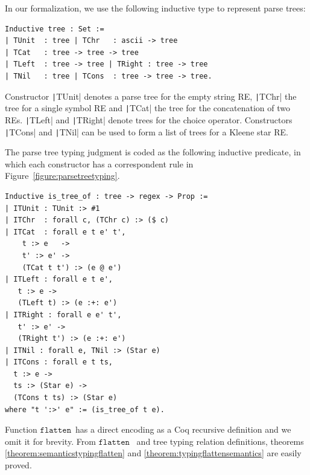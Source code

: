 \documentclass[oneside,12pt]{scrbook}
\theoremstyle{definition}
\newcommand{\flatten}{\ensuremath{\texttt{flatten}}}
\newcommand{\coq}[1]{\texttt|#1|}
\theoremstyle{plain}
\theoremstyle{definition}
\begin{document}
In our formalization, we use the following inductive type to represent parse
trees:

\begin{verbatim}
Inductive tree : Set :=
| TUnit  : tree | TChr   : ascii -> tree
| TCat   : tree -> tree -> tree 
| TLeft  : tree -> tree | TRight : tree -> tree 
| TNil   : tree | TCons  : tree -> tree -> tree.
\end{verbatim}

Constructor \coq{TUnit} denotes a parse tree for the empty string RE,
\coq{TChr} the tree for a single symbol RE and \coq{TCat} the tree for
the concatenation of two REs. \coq{TLeft} and \coq{TRight} denote trees
for the choice operator. Constructors \coq{TCons} and \coq{TNil} can be
used to form a list of trees for a Kleene star RE.

The parse tree typing judgment is
coded as the following inductive predicate, in which each constructor
has a correspondent rule in Figure~\ref{figure:parsetreetyping}.

\begin{verbatim}
Inductive is_tree_of : tree -> regex -> Prop :=
| ITUnit : TUnit :> #1
| ITChr  : forall c, (TChr c) :> ($ c)
| ITCat  : forall e t e' t',
    t :> e   ->
    t' :> e' ->
    (TCat t t') :> (e @ e')
| ITLeft : forall e t e',
   t :> e ->
   (TLeft t) :> (e :+: e')
| ITRight : forall e e' t',
   t' :> e' ->
   (TRight t') :> (e :+: e')
| ITNil : forall e, TNil :> (Star e)
| ITCons : forall e t ts,
  t :> e ->
  ts :> (Star e) ->
  (TCons t ts) :> (Star e)
where "t ':>' e" := (is_tree_of t e).
\end{verbatim}
Function \flatten~has a direct encoding as a Coq recursive definition and
we omit it for brevity. From \flatten~ and tree typing relation definitions,
theorems \ref{theorem:semanticstypingflatten} and
\ref{theorem:typingflattensemantics} are easily proved.
\end{document}
